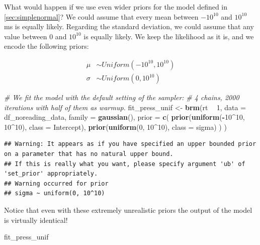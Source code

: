 \documentclass[12pt,]{krantz}
\newenvironment{Shaded}{\begin{snugshade}}{\end{snugshade}}
\newcommand{\KeywordTok}[1]{\textcolor[rgb]{0.13,0.29,0.53}{\textbf{#1}}}
\newcommand{\DataTypeTok}[1]{\textcolor[rgb]{0.13,0.29,0.53}{#1}}
\newcommand{\DecValTok}[1]{\textcolor[rgb]{0.00,0.00,0.81}{#1}}
\newcommand{\StringTok}[1]{\textcolor[rgb]{0.31,0.60,0.02}{#1}}
\newcommand{\CommentTok}[1]{\textcolor[rgb]{0.56,0.35,0.01}{\textit{#1}}}
\newcommand{\OperatorTok}[1]{\textcolor[rgb]{0.81,0.36,0.00}{\textbf{#1}}}
\newcommand{\NormalTok}[1]{#1}
\theoremstyle{definition}
\theoremstyle{definition}
\theoremstyle{definition}
\theoremstyle{remark}
\begin{document}
What would happen if we use even wider priors for the model defined in
\ref{sec:simplenormal}? We could assume that every mean between
\(-10^{10}\) and \(10^{10}\) ms is equally likely. Regarding the
standard deviation, we could assume that any value between \(0\) and
\(10^{10}\) is equally likely. We keep the likelihood as it is, and we
encode the following priors:

\begin{equation}
\begin{aligned}
\mu &\sim Uniform(-10^{10}, 10^{10}) \\
\sigma &\sim Uniform(0,  10^{10}) 
\end{aligned}
\label{eq:rtpriorsflat}
\end{equation}

\begin{Shaded}
\begin{Highlighting}[]
\CommentTok{# We fit the model with the default setting of the sampler:}
\CommentTok{# 4 chains, 2000 iterations with half of them as warmup.}
\NormalTok{fit_press_unif <-}\StringTok{ }\KeywordTok{brm}\NormalTok{(rt }\OperatorTok{~}\StringTok{ }\DecValTok{1}\NormalTok{,}
  \DataTypeTok{data =}\NormalTok{ df_noreading_data,}
  \DataTypeTok{family =} \KeywordTok{gaussian}\NormalTok{(),}
  \DataTypeTok{prior =} \KeywordTok{c}\NormalTok{(}
    \KeywordTok{prior}\NormalTok{(}\KeywordTok{uniform}\NormalTok{(}\OperatorTok{-}\DecValTok{10}\OperatorTok{^}\DecValTok{10}\NormalTok{, }\DecValTok{10}\OperatorTok{^}\DecValTok{10}\NormalTok{), }\DataTypeTok{class =}\NormalTok{ Intercept),}
    \KeywordTok{prior}\NormalTok{(}\KeywordTok{uniform}\NormalTok{(}\DecValTok{0}\NormalTok{, }\DecValTok{10}\OperatorTok{^}\DecValTok{10}\NormalTok{), }\DataTypeTok{class =}\NormalTok{ sigma)}
\NormalTok{  )}
\NormalTok{)}
\end{Highlighting}
\end{Shaded}

\begin{verbatim}
## Warning: It appears as if you have specified an upper bounded prior on a parameter that has no natural upper bound.
## If this is really what you want, please specify argument 'ub' of 'set_prior' appropriately.
## Warning occurred for prior 
## sigma ~ uniform(0, 10^10)
\end{verbatim}

Notice that even with these extremely unrealistic priors the output of
the model is virtually identical!

\begin{Shaded}
\begin{Highlighting}[]
\NormalTok{fit_press_unif}
\end{Highlighting}
\end{Shaded}
\end{document}
